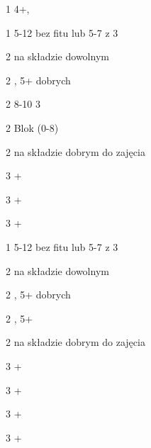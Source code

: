 \documentclass[12pt, a4paper]{article}
\begin{document}
\sequence{{1\hearts}}
\begin{options}[2]
	\item[1\spades] 4+\spades, \fonce
	\item[1\nt] 5-12 bez fitu lub 5-7 z 3\hearts
	\item[2\clubs] \gf na składzie dowolnym
	\item[2\diams] \gf, 5+ dobrych \diams
	\item[2\hearts] 8-10 3\hearts
	\item[2\spades] Blok (0-8)
	\item[2\nt] \gf na składzie dobrym do zajęcia \nt \imp
	\item[3\clubs] +\clubs
	\item[3\diams] +\diams
	\item[3\hearts] +\hearts
\end{options}


\sequence{{1\spades}}
\begin{options}[2]
	\item[1\nt] 5-12 bez fitu lub 5-7 z 3\spades
	\item[2\clubs] \gf na składzie dowolnym
	\item[2\diams] \gf, 5+ dobrych \diams
	\item[2\hearts] \gf, 5+ \hearts
	\item[2\nt] \gf na składzie dobrym do zajęcia \nt \imp
	\item[3\clubs] +\clubs
	\item[3\diams] +\diams
	\item[3\hearts] +\hearts
	\item[3\spades] +\spades
\end{options}
\end{document}
